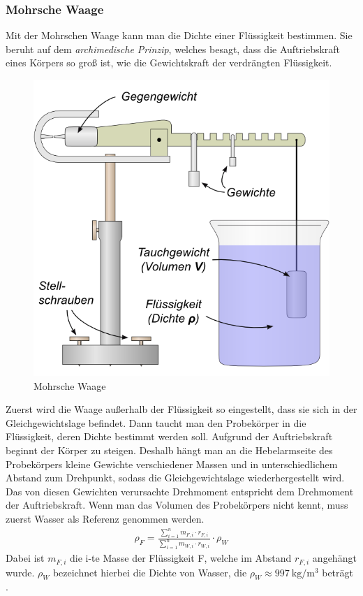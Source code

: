 \documentclass[12pt,a4paper,titlepage,headinclude,bibtotoc]{scrartcl}
\begin{document}
\subsubsection{Mohrsche Waage}
Mit der Mohrschen Waage kann man die Dichte einer Flüssigkeit bestimmen.
Sie beruht auf dem \textit{archimedische Prinzip}, welches besagt, dass die Auftriebskraft eines Körpers so groß ist, wie die Gewichtskraft der verdrängten Flüssigkeit.\\
\begin{figure}[!htb]
	\centering
	\includegraphics[scale=0.7]{MohrscheWaage.png}
	\caption{Mohrsche Waage \cite{lp}}
	\label{fig:MohrscheWaage}
\end{figure}
Zuerst wird die Waage außerhalb der Flüssigkeit so eingestellt, dass sie sich in der Gleichgewichtslage befindet.
Dann taucht man den Probekörper in die Flüssigkeit, deren Dichte bestimmt werden soll.
Aufgrund der Auftriebskraft beginnt der Körper zu steigen.
Deshalb hängt man an die Hebelarmseite des Probekörpers kleine Gewichte verschiedener Massen und in unterschiedlichem Abstand zum Drehpunkt, sodass die Gleichgewichtslage wiederhergestellt wird.
Das von diesen Gewichten verursachte Drehmoment entspricht dem Drehmoment der Auftriebskraft.
Wenn man das Volumen des Probekörpers nicht kennt, muss zuerst Wasser als Referenz genommen werden.\\
\begin{align}
\rho_F=\frac{\sum\limits_{i=1}^nm_{F,i}\cdot r_{F,i}}{\sum\limits_{i=1}^nm_{W,i}\cdot r_{W,i}}\cdot\rho_W
\end{align}
Dabei ist $m_{F,i}$ die i-te Masse der Flüssigkeit F, welche im Abstand $r_{F,i}$ angehängt wurde.
$\rho_W$ bezeichnet hierbei die Dichte von Wasser, die   $\rho_W\approx 997~\si{\kilo\gram/\meter^3}$ beträgt \cite[S. 258]{gerthsen}.
\end{document}

